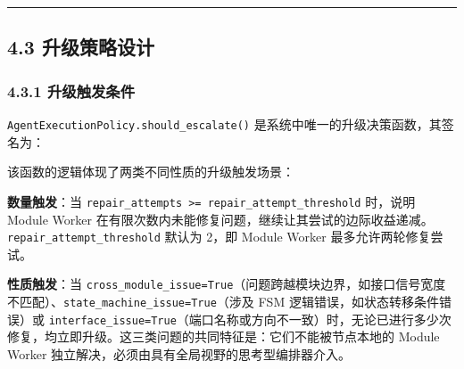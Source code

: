 \begin{center}\rule{0.5\linewidth}{0.5pt}\end{center}

\subsection{4.3
升级策略设计}\label{ux5347ux7ea7ux7b56ux7565ux8bbeux8ba1}

\subsubsection{4.3.1
升级触发条件}\label{ux5347ux7ea7ux89e6ux53d1ux6761ux4ef6}

\texttt{AgentExecutionPolicy.should\_escalate()}
是系统中唯一的升级决策函数，其签名为：

\begin{Shaded}
\begin{Highlighting}[]
    \NormalTok{,}
\NormalTok{,}
    \OperatorTok{*}\NormalTok{,}
 \OperatorTok{=} \NormalTok{,}
 \OperatorTok{=} \NormalTok{,}
 \OperatorTok{=} \NormalTok{,}
\NormalTok{) }\OperatorTok{{-}\textgreater{}} \NormalTok{:}
    \NormalTok{ (}
\OperatorTok{\textgreater{}=} 
\NormalTok{    )}
\end{Highlighting}
\end{Shaded}

该函数的逻辑体现了两类不同性质的升级触发场景：

\textbf{数量触发}：当
\texttt{repair\_attempts\ \textgreater{}=\ repair\_attempt\_threshold}
时，说明 Module Worker
在有限次数内未能修复问题，继续让其尝试的边际收益递减。\texttt{repair\_attempt\_threshold}
默认为 2，即 Module Worker 最多允许两轮修复尝试。

\textbf{性质触发}：当
\texttt{cross\_module\_issue=True}（问题跨越模块边界，如接口信号宽度不匹配）、\texttt{state\_machine\_issue=True}（涉及
FSM 逻辑错误，如状态转移条件错误）或
\texttt{interface\_issue=True}（端口名称或方向不一致）时，无论已进行多少次修复，均立即升级。这三类问题的共同特征是：它们不能被节点本地的
Module Worker 独立解决，必须由具有全局视野的思考型编排器介入。

